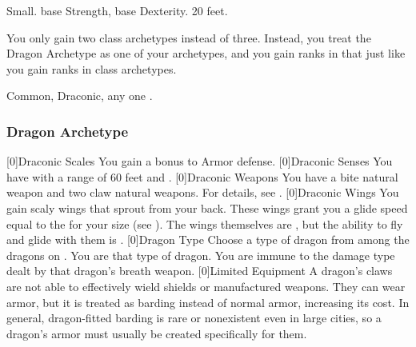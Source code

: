          Small.
          base Strength,  base Dexterity.
         20 feet.
        \begin{itemize}
             You only gain two class archetypes instead of three.
                Instead, you treat the Dragon Archetype as one of your archetypes, and you gain ranks in that just like you gain ranks in class archetypes.
        \end{itemize}
         Common, Draconic, any one .

        \subsubsection{Dragon Archetype}
            [0]{Draconic Scales} You gain a  bonus to Armor defense.
            [0]{Draconic Senses} You have   with a range of 60 feet and .
            [0]{Draconic Weapons} You have a bite natural weapon and two claw natural weapons.
                For details, see .
            [0]{Draconic Wings} You gain scaly wings that sprout from your back.
                These wings grant you a glide speed equal to the  for your size (see ).
                The wings themselves are , but the ability to fly and glide with them is .
            [0]{Dragon Type} Choose a type of dragon from among the dragons on .
                You are that type of dragon.
                You are immune to the damage type dealt by that dragon's breath weapon.
            [0]{Limited Equipment} A dragon's claws are not able to effectively wield shields or manufactured weapons.
            They can wear armor, but it is treated as barding instead of normal armor, increasing its cost.
            In general, dragon-fitted barding is rare or nonexistent even in large cities, so a dragon's armor must usually be created specifically for them.

